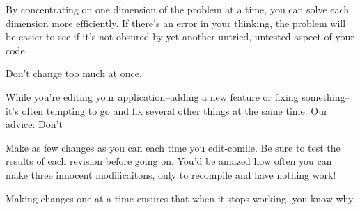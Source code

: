 By concentrating on one dimension of the problem at a time, you can solve each dimension more efficiently. If there's an error in your thinking, the problem will be easier to see if it's not obsured by yet another untried, untested aspect of your code.

\begin{tip}
Don't change too much at once.
\end{tip}
While you're editing your application--adding a new feature or fixing something--it's often tempting to go and fix several other things at the same time. Our advice: Don't

Make as few changes as you can each time you edit-comile. Be sure to test the results of each revision before going on. You'd be amazed how often you can make three innocent modificaitons, only to recompile and have nothing work!

Making changes one at a time ensures that when it stops working, you know why.

